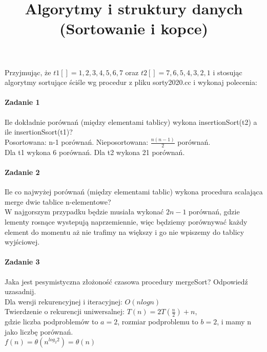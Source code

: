 \documentclass[18pt]{extarticle}
\begin{document}
\large
{}\selectfont

\title{Algorytmy i struktury danych (Sortowanie i kopce)}
\date{}
\maketitle

Przyjmując, że $t1[]={1,2,3,4,5,6,7}$ oraz $t2[]={7,6,5,4,3,2,1}$ i stosując algorytmy sortujące ściśle wg procedur z pliku sorty2020.cc i wykonaj polecenia:

\paragraph{Zadanie 1} Ile dokładnie porównań (między elementami  tablicy) wykona insertionSort(t2) a ile insertionSsort(t1)? \\

Posortowana: n-1 porównań. Nieposortowana: $\frac{n(n-1)}{2}$ porównań. \\
Dla t1 wykona 6 porównań. Dla t2 wykona 21 porównań.

\paragraph{Zadanie 2} Ile co najwyżej porównań (między elementami tablic) wykona procedura scalająca merge dwie tablice n-elementowe? \\


W najgorszym przypadku będzie musiała wykonać $2n - 1$ porównań, gdzie lementy rosnące wystepują naprzemiennie, więc będziemy porównywać każdy element do momentu aż nie trafimy na większy i go nie wpiszemy do tablicy wyjściowej.

\paragraph{Zadanie 3} Jaka jest pesymistyczna złożoność czasowa procedury mergeSort? Odpowiedź uzasadnij. \\


Dla wersji rekurencyjnej i iteracyjnej: $O(nlogn)$ \\

Twierdzenie o rekurencji uniwersalnej: $T(n) = 2T(\frac{n}{2}) + n$,\\ gdzie liczba podproblemów to $a = 2$, rozmiar podproblemu to $b = 2$, i mamy n jako liczbę porównań.\\

$f(n)=\theta(n^{log_{2}{2}})=\theta(n)$\\
\end{document}
